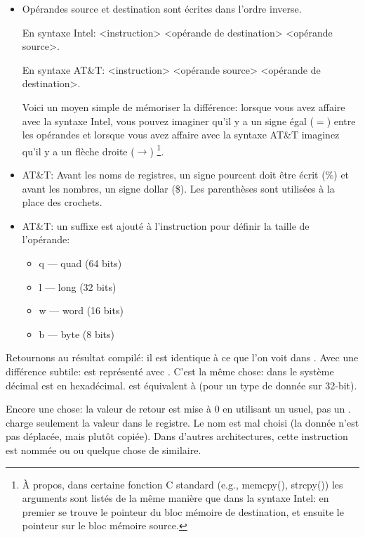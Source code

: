 \begin{itemize}

\item
Opérandes source et destination sont écrites dans l'ordre inverse.

En syntaxe Intel: <instruction> <opérande de destination> <opérande source>.

En syntaxe AT\&T: <instruction> <opérande source> <opérande de destination>.

Voici un moyen simple de mémoriser la différence:
lorsque vous avez affaire avec la syntaxe Intel, vous pouvez imaginer qu'il y a un signe
égal ($=$) entre les opérandes et lorsque vous avez affaire avec la syntaxe AT\&T imaginez
qu'il y a un flèche droite ($\rightarrow$)
\footnote{À propos, dans certaine fonction C standard (e.g., memcpy(), strcpy()) les arguments
sont listés de la même manière que dans la syntaxe Intel: en premier se trouve le pointeur du
bloc mémoire de destination, et ensuite le pointeur sur le bloc mémoire source.}.

\item
AT\&T: Avant les noms de registres, un signe pourcent doit être écrit (\%) et avant les nombres, un signe dollar (\$).
Les parenthèses sont utilisées à la place des crochets.

\item
AT\&T: un suffixe est ajouté à l'instruction pour définir la taille de l'opérande:

\begin{itemize}
\item q --- quad (64 bits)
\item l --- long (32 bits)
\item w --- word (16 bits)
\item b --- byte (8 bits)
\end{itemize}


\end{itemize}

Retournons au résultat compilé: il est identique à ce que l'on voit dans \IDA.
Avec une différence subtile:  est représenté avec .
C'est la même chose:  dans le système décimal est  en hexadécimal.
 est équivalent à  (pour un type de donnée sur 32-bit).

Encore une chose: la valeur de retour est mise à 0 en utilisant un \MOV usuel, pas un \XOR.
\MOV charge seulement la valeur dans le registre.
Le nom est mal choisi (la donnée n'est pas déplacée, mais plutôt copiée). Dans d'autres architectures, cette instruction
est nommée  ou  ou quelque chose de similaire.

